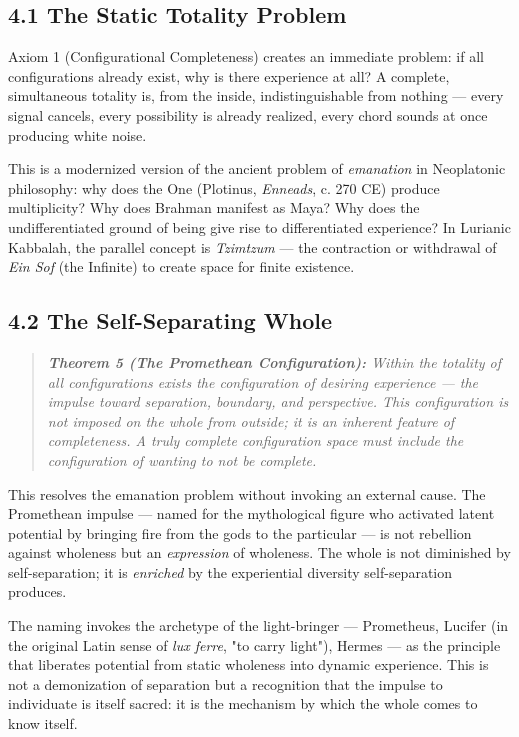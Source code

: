\subsection*{4.1 The Static Totality Problem}


Axiom 1 (Configurational Completeness) creates an immediate problem: if all configurations already exist, why is there experience at all? A complete, simultaneous totality is, from the inside, indistinguishable from nothing — every signal cancels, every possibility is already realized, every chord sounds at once producing white noise.


This is a modernized version of the ancient problem of \textit{emanation} in Neoplatonic philosophy: why does the One (Plotinus, \textit{Enneads}, c. 270 CE) produce multiplicity? Why does Brahman manifest as Maya? Why does the undifferentiated ground of being give rise to differentiated experience? In Lurianic Kabbalah, the parallel concept is \textit{Tzimtzum} — the contraction or withdrawal of \textit{Ein Sof} (the Infinite) to create space for finite existence.


\subsection*{4.2 The Self-Separating Whole}


\begin{quote}
\itshape
\textbf{Theorem 5 (The Promethean Configuration):} \textit{Within the totality of all configurations exists the configuration of desiring experience — the impulse toward separation, boundary, and perspective. This configuration is not imposed on the whole from outside; it is an inherent feature of completeness. A truly complete configuration space must include the configuration of wanting to not be complete.}
\end{quote}


This resolves the emanation problem without invoking an external cause. The Promethean impulse — named for the mythological figure who activated latent potential by bringing fire from the gods to the particular — is not rebellion against wholeness but an \textit{expression} of wholeness. The whole is not diminished by self-separation; it is \textit{enriched} by the experiential diversity self-separation produces.


The naming invokes the archetype of the light-bringer — Prometheus, Lucifer (in the original Latin sense of \textit{lux ferre}, "to carry light"), Hermes — as the principle that liberates potential from static wholeness into dynamic experience. This is not a demonization of separation but a recognition that the impulse to individuate is itself sacred: it is the mechanism by which the whole comes to know itself.


